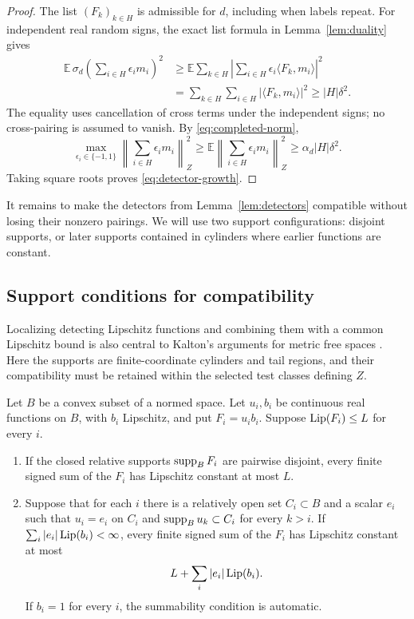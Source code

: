 \begin{proof}
The list \((F_k)_{k\in H}\) is admissible for \(d\), including when
labels repeat. For independent real random signs, the exact list
formula in Lemma~\ref{lem:duality} gives
\begin{align*}
 \mathbb E\,\sigma_d\!\left(\sum_{i\in H}\epsilon_i m_i\right)^2
 &\geq
 \mathbb E\sum_{k\in H}
       \left|\sum_{i\in H}\epsilon_i
                    \langle F_k,m_i\rangle\right|^2\\
 &=\sum_{k\in H}\sum_{i\in H}|\langle F_k,m_i\rangle|^2
 \geq |H|\delta^2.
\end{align*}
The equality uses cancellation of cross terms under the independent
signs; no cross-pairing is assumed to vanish. By
\eqref{eq:completed-norm},
\[
 \max_{\epsilon_i\in\{-1,1\}}
       \left\|\sum_{i\in H}\epsilon_i m_i\right\|_Z^2
 \geq\mathbb E\left\|\sum_{i\in H}\epsilon_i m_i\right\|_Z^2
 \geq\alpha_d|H|\delta^2.
\]
Taking square roots proves \eqref{eq:detector-growth}.
\end{proof}

It remains to make the detectors from Lemma~\ref{lem:detectors}
compatible without losing their nonzero pairings. We will use two
support configurations: disjoint supports, or later supports contained
in cylinders where earlier functions are constant.

\subsection{Support conditions for compatibility}

Localizing detecting Lipschitz functions and combining them with a
common Lipschitz bound is also central to Kalton's arguments for
metric free spaces \cite[Lemma~4.5 and proof of Theorem~4.6]{Kalton04}.
Here the supports are finite-coordinate cylinders and tail regions,
and their compatibility must be retained within the selected test
classes defining \(Z\).

\begin{lemma}\label{lem:compatible}
Let \(B\) be a convex subset of a normed space. Let \(u_i,b_i\)
be continuous real functions on \(B\), with \(b_i\) Lipschitz, and
put \(F_i=u_i b_i\). Suppose
\(\operatorname{Lip}(F_i)\leq L\) for every \(i\).
\begin{enumerate}
\item If the closed relative supports \(\operatorname{supp}_B F_i\) are pairwise
disjoint, every finite signed sum of the \(F_i\) has Lipschitz
constant at most \(L\).
\item Suppose that for each \(i\) there is a relatively open set
\(C_i\subset B\) and a scalar \(e_i\) such that \(u_i=e_i\) on
\(C_i\) and \(\operatorname{supp}_B u_k\subset C_i\) for every \(k>i\).
If \(\sum_i|e_i|\operatorname{Lip}(b_i)<\infty\), every finite signed sum of the
\(F_i\) has Lipschitz constant at most
\[
                         L+\sum_i|e_i|\operatorname{Lip}(b_i).
\]
If \(b_i=1\) for every \(i\), the summability condition is automatic.
\end{enumerate}
\end{lemma}


